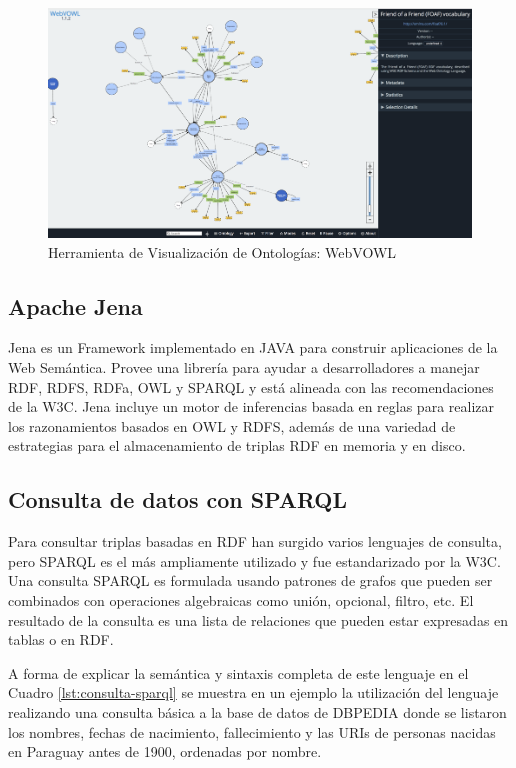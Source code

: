 \begin{figure}[h!]
    \centering
    \includegraphics[width=150mm]{figuras/webvowl}
    \caption{Herramienta de Visualización de Ontologías: WebVOWL}
    \label{img:webvowl}
    \end{figure}
    

\subsection{Apache Jena}
Jena es un Framework implementado en JAVA para construir aplicaciones de la Web Semántica. Provee una librería para ayudar a desarrolladores a manejar RDF, RDFS, RDFa, OWL y SPARQL y está alineada con las recomendaciones de la W3C. Jena incluye un motor de inferencias basada en reglas para realizar los razonamientos basados en OWL y RDFS, además de una variedad de estrategias para el almacenamiento de triplas RDF en memoria y en disco.

\subsection{Consulta de datos con SPARQL}
Para consultar triplas basadas en RDF han surgido varios lenguajes de consulta, pero SPARQL es el más ampliamente utilizado y fue estandarizado por la W3C. Una consulta SPARQL es formulada usando patrones de grafos que pueden ser combinados con operaciones algebraicas como unión, opcional, filtro, etc. El resultado de la consulta es una lista de relaciones que pueden estar expresadas en tablas o en RDF.

A forma de explicar la semántica y sintaxis completa de este lenguaje en el Cuadro \ref{lst:consulta-sparql} se muestra en un ejemplo la utilización del lenguaje realizando una consulta básica a la base de datos de DBPEDIA \cite{DBpedia:online} donde se listaron los nombres, fechas de nacimiento, fallecimiento y las URIs de personas nacidas en Paraguay antes de 1900, ordenadas por nombre.

